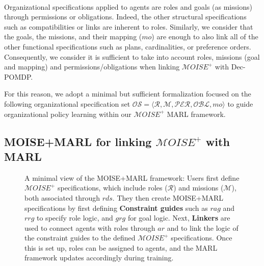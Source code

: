 \documentclass[pdflatex,sn-mathphys-num]{sn-jnl}%
\theoremstyle{thmstyleone}%
\theoremstyle{thmstyletwo}%
\theoremstyle{thmstylethree}%
\begin{document}
\

\noindent Organizational specifications applied to agents are roles and goals (as missions) through permissions or obligations. Indeed, the other structural specifications such as compatibilities or links are inherent to roles. Similarly, we consider that the goals, the missions, and their mapping ($mo$) are enough to also link all of the other functional specifications such as plans, cardinalities, or preference orders.
Consequently, we consider it is sufficient to take into account roles, missions (goal and mapping) and permissions/obligations when linking $\mathcal{M}OISE^+$ with Dec-POMDP. 

For this reason, we adopt a minimal but sufficient formalization focused on the following organizational specification set $\mathcal{OS} = \langle \mathcal{R}, \mathcal{M}, \mathcal{PER}, \mathcal{OBL}, mo \rangle$ to guide organizational policy learning within our $\mathcal{M}OISE^+$ MARL framework.


\subsection{MOISE+MARL for linking $\mathcal{M}OISE^+$ with MARL}

\begin{figure}[h!]
    \centering
    
    \caption{A minimal view of the MOISE+MARL framework:
        Users first define $\mathcal{M}OISE^+$ specifications, which include roles ($\mathcal{R}$) and missions ($\mathcal{M}$), both associated through $rds$. They then create MOISE+MARL specifications by first defining \textbf{Constraint guides} such as $rag$ and $rrg$ to specify role logic, and $grg$ for goal logic. 
        Next, \textbf{Linkers} are used to connect agents with roles through $ar$ and to link the logic of the constraint guides to the defined $\mathcal{M}OISE^+$ specifications. Once this is set up, roles can be assigned to agents, and the MARL framework updates accordingly during training.
    }
    \label{fig:mm_synthesis}
\end{figure}
\end{document}
